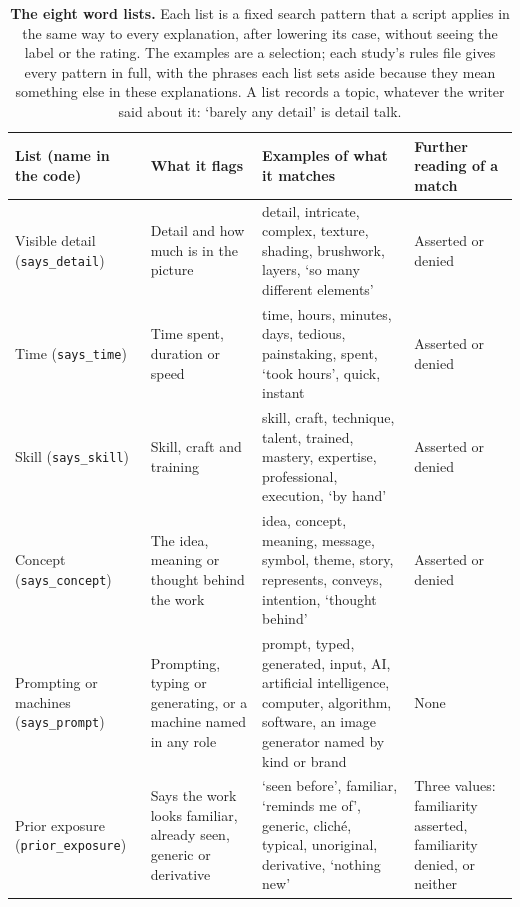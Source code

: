 \begin{table}[tbp]
\centering
\small
\caption{\textbf{The eight word lists.} Each list is a fixed search pattern that a script applies in the same way to every explanation, after lowering its case, without seeing the label or the rating. The examples are a selection; each study's rules file gives every pattern in full, with the phrases each list sets aside because they mean something else in these explanations. A list records a topic, whatever the writer said about it: `barely any detail' is detail talk.}
\label{tab:suppA-wordlists}
\begin{tabular}{@{}>{\raggedright\arraybackslash}p{2.6cm}>{\raggedright\arraybackslash}p{3.4cm}>{\raggedright\arraybackslash}p{\dimexpr\textwidth-9.4cm-6\tabcolsep\relax}>{\raggedright\arraybackslash}p{3.4cm}@{}}
\toprule
List (name in the code) & What it flags & Examples of what it matches & Further reading of a match\\
\midrule
Visible detail (\nolinkurl{says_detail}) & Detail and how much is in the picture & detail, intricate, complex, texture, shading, brushwork, layers, `so many different elements' & Asserted or denied\\
\addlinespace
Time (\nolinkurl{says_time}) & Time spent, duration or speed & time, hours, minutes, days, tedious, painstaking, spent, `took hours', quick, instant & Asserted or denied\\
\addlinespace
Skill (\nolinkurl{says_skill}) & Skill, craft and training & skill, craft, technique, talent, trained, mastery, expertise, professional, execution, `by hand' & Asserted or denied\\
\addlinespace
Concept (\nolinkurl{says_concept}) & The idea, meaning or thought behind the work & idea, concept, meaning, message, symbol, theme, story, represents, conveys, intention, `thought behind' & Asserted or denied\\
\addlinespace
Prompting or machines (\nolinkurl{says_prompt}) & Prompting, typing or generating, or a machine named in any role & prompt, typed, generated, input, AI, artificial intelligence, computer, algorithm, software, an image generator named by kind or brand & None\\
\addlinespace
Prior exposure (\nolinkurl{prior_exposure}) & Says the work looks familiar, already seen, generic or derivative & `seen before', familiar, `reminds me of', generic, cliché, typical, unoriginal, derivative, `nothing new' & Three values: familiarity asserted, familiarity denied, or neither\\

\end{tabular}
\end{table}
